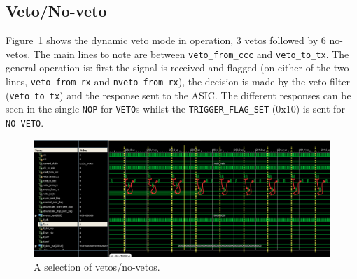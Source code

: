 \clearpage
\subsection{Veto/No-veto} %
\label{sec:veto_no_veto}
Figure~\ref{fig:isim_veto_no_veto} shows the dynamic veto mode in operation, 3 vetos followed by 6 no-vetos. The main lines to note are between \texttt{veto\_from\_ccc} and \texttt{veto\_to\_tx}. The general operation is: first the signal is received and flagged (on either of the two lines, \texttt{veto\_from\_rx} and \texttt{nveto\_from\_rx}), the decision is made by the veto-filter (\texttt{veto\_to\_tx}) and the response sent to the ASIC. The different responses can be seen in the single \texttt{NOP} for \texttt{VETO}s whilst the \texttt{TRIGGER\_FLAG\_SET} (0x10) is sent for \texttt{NO-VETO}. 

\begin{figure}
  \centering
  \includegraphics[width=\textwidth]{images/isim/edited/veto_no_veto.png}
  \caption{A selection of vetos/no-vetos.}
  \label{fig:isim_veto_no_veto}
\end{figure}
\clearpage
